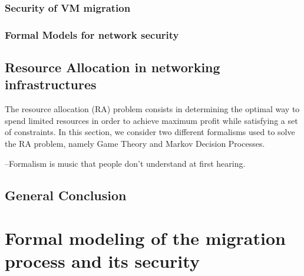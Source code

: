 \documentclass[a4paper, 11pt]{report}
\newcommand{\boxedtext}[1]{\fbox{\scriptsize\bfseries\textsf{#1}}}
\newcommand{\myremark}[2]{
   \textcolor{blue}{\boxedtext{#1}
      {\small$\blacktriangleright$\emph{\textsl{#2}}$\blacktriangleleft$}
}}
\newcommand\GB[1]{\myremark{GBAA}{#1}}
\newcommand{\ie}{i.e.,\xspace}
\theoremstyle{definition}
\begin{document}
\subsection{Security of VM migration}



\subsection{Formal Models for network security}



\section{Resource Allocation in networking infrastructures}
The resource allocation (RA) problem consists in determining the optimal way to spend limited resources in order to achieve maximum profit while satisfying a set of constraints.
In this section, we consider two different formalisms used to solve the RA problem, namely Game Theory and Markov Decision Processes. 

% 



\begin{savequote}

--Formalism is music that people don't understand at first hearing.
\end{savequote}
\section{General Conclusion}


\newpage
\chapter{Formal modeling of the migration process and its security}
\label{sec:formal_model}

\end{document}
